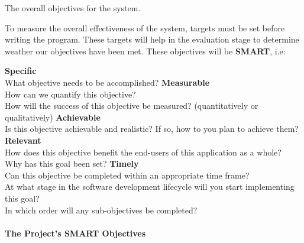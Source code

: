 \documentclass[../../../main.tex]{subfiles}
\begin{document}
The overall objectives for the system.

\noindent To measure the overall effectiveness of the system, targets must be set before writing the program.
These targets will help in the evaluation stage to determine weather our objectives have been met.
These objectives will be \textbf{SMART}, i.e:

\begin{outline}
    \1 \textbf{Specific}\\
    What objective needs to be accomplished?
    \1 \textbf{Measurable}\\
    How can we quantify this objective?\\
    How will the success of this objective be measured? (quantitatively or qualitatively)
    \1 \textbf{Achievable}\\
    Is this objective achievable and realistic? If so, how to you plan to achieve them?
    \1 \textbf{Relevant}\\
    How does this objective benefit the end-users of this application as a whole?\\
    Why has this goal been set?
    \1 \textbf{Timely}\\
    Can this objective be completed within an appropriate time frame?\\
    At what stage in the software development lifecycle will you start implementing this goal?\\
    In which order will any sub-objectives be completed?
\end{outline}

\paragraph{The Project's SMART Objectives}
\end{document}
